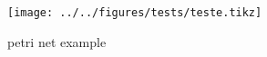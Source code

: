 


\OmegaSet

\begin{figure}[H]
  \centering
  \texttt{[image: ../../figures/tests/teste.tikz]}
  \caption{petri net example}
  \label{fig:petrinetexample}
\end{figure}


\clearpage

% 
% 
% 
% 
% 
% 
% 
% 





